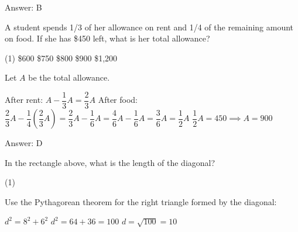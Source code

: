 \documentclass[11pt,paper=a4,answers]{exam}
\begin{document}
\begin{questions}
\begin{solution}
Answer: \colorbox{yellow!100}{B}
\end{solution}

\vspace{1cm}

\question
A student spends 1/3 of her allowance on rent and 1/4 of the remaining amount on food. If she has \$450 left, what is her total allowance?

\begin{tasks}(1)
\task[A)] \$600 \task[B)] \$750 \task[C)] \$800 \task[D)] \$900 \task[E)] \$1,200
\end{tasks}

\begin{solution}
Let $A$ be the total allowance.
\vspace{5pt}
\begin{center}
After rent: $A - \dfrac{1}{3}A = \dfrac{2}{3}A$
\vspace{5pt}
After food: $\dfrac{2}{3}A - \dfrac{1}{4}\left(\dfrac{2}{3}A\right) = \dfrac{2}{3}A - \dfrac{1}{6}A = \dfrac{4}{6}A - \dfrac{1}{6}A = \dfrac{3}{6}A = \dfrac{1}{2}A$
\vspace{5pt}
$\dfrac{1}{2}A = 450 \implies A = 900$
\end{center}

Answer: \colorbox{yellow!100}{D}
\end{solution}

\vspace{1cm}

\question
\begin{center}
\end{center}
In the rectangle above, what is the length of the diagonal?

\begin{tasks}(1)
    
\end{tasks}

\begin{solution}
Use the Pythagorean theorem for the right triangle formed by the diagonal:
\vspace{5pt}
\begin{center}
$d^2 = 8^2 + 6^2$
\vspace{5pt}
$d^2 = 64 + 36 = 100$
\vspace{5pt}
$d = \sqrt{100} = 10$
\end{center}


\end{solution}
\end{questions}
\end{document}
